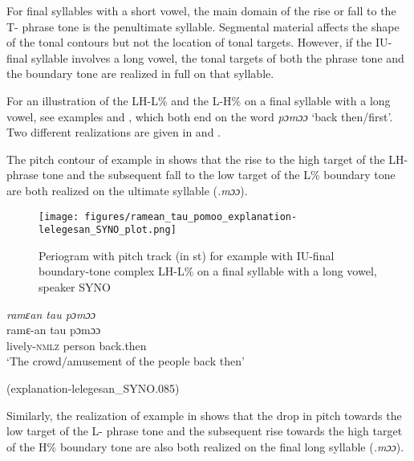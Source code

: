 For final syllables with a short vowel, the main domain of the rise or fall to the T- phrase tone is the penultimate syllable. Segmental material affects the shape of the tonal contours but not the location of tonal targets.
However, if the IU-final syllable involves a long vowel, the tonal targets of both the phrase tone and the boundary tone are realized in full on that syllable.



\largerpage
For an illustration of the LH-L\% and the L-H\% on a final syllable with a long vowel, see examples  and , which both end on the word \textit{pɔmɔɔ} ‘back then/first’. Two different realizations are given in   and  .  



The pitch contour of example  in   shows that the rise to the high target of the LH- phrase tone and the subsequent fall to the low target of the L\% boundary tone are both realized on the ultimate syllable (\textit{.mɔɔ}).

\begin{figure}
	\texttt{[image: figures/ramean\_tau\_pomoo\_explanation-lelegesan\_SYNO\_plot.png]}
	\caption{Periogram with pitch track (in st) for example  with IU-final boundary-tone complex LH-L\% on a final syllable with a  long vowel, speaker SYNO}
	\label{pitch:ramean tau pomoo}
\end{figure}


\ea
\label{ex:ramean tau pomoo}
\textit{ramɛan tau pɔmɔɔ} \\
\gll ramɛ-an tau pɔmɔɔ  \\
lively-\textsc{nmlz} person back.then \\ 
\glt ‘The crowd/amusement of the people back then’ \begin{flushright}(explanation-lelegesan\_SYNO.085)
	\end{flushright}
\z




Similarly, the realization of example  in   shows that the drop in pitch towards the low target of the L- phrase tone and the subsequent rise towards the high target of the H\% boundary tone are also both realized on the final long syllable (\textit{.mɔɔ}).



